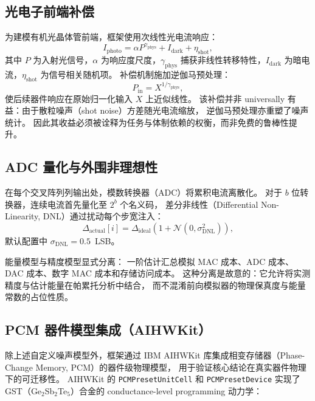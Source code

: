 \subsection{光电子前端补偿}

为建模有机光晶体管前端，框架使用次线性光电流响应：
\begin{equation}
I_{\text{photo}} = \alpha P^{\gamma_{\text{phys}}} + I_{\text{dark}} + \eta_{\text{shot}},
\label{eq:photocurrent}
\end{equation}
其中 $P$ 为入射光信号，$\alpha$ 为响应度尺度，$\gamma_{\text{phys}}$ 捕获非线性转移特性，$I_{\text{dark}}$ 为暗电流，$\eta_{\text{shot}}$ 为信号相关随机项。
补偿机制施加逆伽马预处理：
\begin{equation}
P_{\text{in}} = X^{1/\gamma_{\text{phys}}},
\label{eq:inverse-gamma}
\end{equation}
使后续器件响应在原始归一化输入 $X$ 上近似线性。
该补偿并非 universally 有益：由于散粒噪声（shot noise）方差随光电流缩放，
逆伽马预处理亦重塑了噪声统计。
因此其收益必须被诠释为任务与体制依赖的权衡，而非免费的鲁棒性提升。

\subsection{ADC 量化与外围非理想性}

在每个交叉阵列列输出处，模数转换器（ADC）将累积电流离散化。
对于 $b$ 位转换器，连续电流首先量化至 $2^b$ 个名义码，
差分非线性（Differential Non-Linearity, DNL）通过扰动每个步宽注入：
\begin{equation}
\Delta_{\text{actual}}[i] = \Delta_{\text{ideal}} \left(1 + \mathcal{N}(0, \sigma_{\text{DNL}}^2)\right),
\label{eq:dnl}
\end{equation}
默认配置中 $\sigma_{\text{DNL}} = 0.5$~LSB。

能量模型与精度模型显式分离：
一阶估计汇总模拟 MAC 成本、ADC 成本、DAC 成本、数字 MAC 成本和存储访问成本。
这种分离是故意的：它允许将实测精度与估计能量在帕累托分析中结合，
而不混淆前向模拟器的物理保真度与能量常数的占位性质。

\subsection{PCM 器件模型集成（AIHWKit）}

除上述自定义噪声模型外，框架通过 IBM AIHWKit 库集成相变存储器（Phase-Change Memory, PCM）的器件级物理模型，
用于验证核心结论在真实器件物理下的可迁移性。
AIHWKit 的 \texttt{PCMPresetUnitCell} 和 \texttt{PCMPresetDevice} 实现了 GST（Ge$_2$Sb$_2$Te$_5$）合金的 conductance-level programming 动力学：

